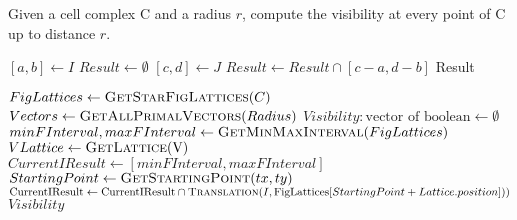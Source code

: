 \documentclass[runningheads]{llncs}
\begin{document}
    \begin{algorithm}
        \caption{Given a cell complex C and a radius $r$, compute the visibility at every point of C up to distance $r$.}
        \label{alg:visibility}
        \begin{algorithmic}
                \State $[a, b] \gets I$
                \State $Result \gets \emptyset$
                    \State $[c, d] \gets J$
                        \State $Result \gets Result \cap [c-a,d-b]$
                    \EndIf
                \EndFor
                \State \Return Result
            \EndFunction

                \State $FigLattices \gets \Call{GetStarFigLattices}{C}$
                \State $Vectors \gets \Call{GetAllPrimalVectors}{Radius}$
                \State $Visibility: \text{vector of boolean} \gets \emptyset$
                \State $minFInterval, maxFInterval \gets \Call{GetMinMaxInterval}{FigLattices}$
                    \State $VLattice \gets \Call{GetLattice}{\text{V}}$
                        \State $CurrentIResult \gets [minFInterval, maxFInterval]$
                        \State $StartingPoint \gets \Call{GetStartingPoint}{tx, ty}$
                                \State $\text{CurrentIResult} \gets \text{CurrentIResult} \cap \Call{Translation}{I, \text{FigLattices}[StartingPoint + Lattice.position])}$
                            \EndFor
                        \EndFor
                        \State {}
                    \EndFor
                \EndFor
                \State \Return $Visibility$
            \EndFunction


        \end{algorithmic}
    \end{algorithm}
\end{document}
